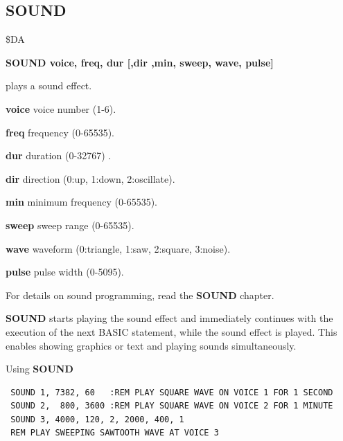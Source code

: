 \subsection{SOUND}
\begin{description}[leftmargin=2cm,style=nextline]
\item [Token:] \$DA
\item [Format:] {\bf SOUND voice, freq, dur
                [,dir ,min, sweep, wave, pulse]}

\item [Usage:] plays a sound effect.

               {\bf voice} voice number (1-6).

               {\bf freq} frequency (0-65535).

               {\bf dur} duration (0-32767) .

               {\bf dir} direction (0:up, 1:down, 2:oscillate).

               {\bf min} minimum frequency (0-65535).

               {\bf sweep} sweep range (0-65535).

               {\bf wave} waveform (0:triangle, 1:saw, 2:square,
               3:noise).

               {\bf pulse} pulse width (0-5095).

For details on sound programming, read the {\bf SOUND} chapter.

\item [Remarks:] {\bf SOUND} starts playing the sound
               effect and immediately continues with the execution
               of the next BASIC statement, while the sound effect
               is played. This enables showing graphics or text
               and playing sounds simultaneously.

\item [Example:] Using {\bf SOUND}
\begin{tcolorbox}[colback=black,coltext=white]
\verbatimfont{\codefont}
\begin{verbatim}
 SOUND 1, 7382, 60   :REM PLAY SQUARE WAVE ON VOICE 1 FOR 1 SECOND
 SOUND 2,  800, 3600 :REM PLAY SQUARE WAVE ON VOICE 2 FOR 1 MINUTE
 SOUND 3, 4000, 120, 2, 2000, 400, 1
 REM PLAY SWEEPING SAWTOOTH WAVE AT VOICE 3
\end{verbatim}
\end{tcolorbox}
\end{description}

